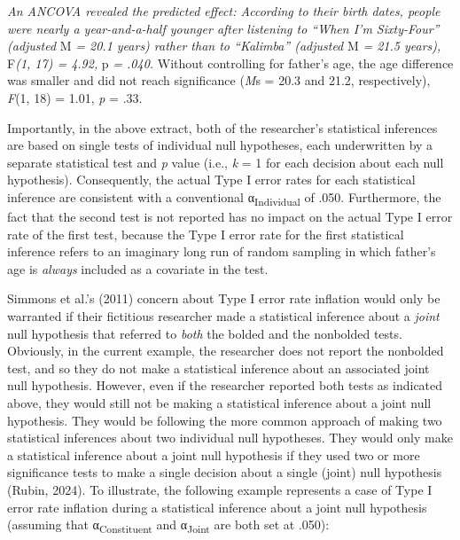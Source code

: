 \documentclass[authordate, meta]{jote-new-article}
\begin{document}
	
	\begin{minipage}{.46\textwidth}%
		\emph{An ANCOVA revealed the predicted effect: According to their birth dates, people were nearly a year-and-a-half younger after listening to “When I'm Sixty-Four” (adjusted }M\emph{ = 20.1 years) rather than to “Kalimba” (adjusted }M \emph{= 21.5 years), }F\emph{(1, 17) = 4.92, }p\emph{ = .040.} Without controlling for father's age, the age difference was smaller and did not reach significance (\emph{M}s = 20.3 and 21.2, respectively), \emph{F}(1, 18) = 1.01, \emph{p} = .33.
	\end{minipage}%

		



	Importantly, in the above extract, both of the researcher's statistical inferences are based on single tests of individual null hypotheses, each underwritten by a separate statistical test and\emph{ p} value (i.e., \emph{k }= 1 for each decision about each null hypothesis). Consequently, the actual Type I error rates for each statistical inference are consistent with a conventional α\textsubscript{Individual} of .050. Furthermore, the fact that the second test is not reported has no impact on the actual Type I error rate of the first test, because the Type I error rate for the first statistical inference refers to an imaginary long run of random sampling in which father's age is \emph{always} included as a covariate in the test.



	Simmons et al.'s (2011) concern about Type I error rate inflation would only be warranted if their fictitious researcher made a statistical inference about a \emph{joint} null hypothesis that referred to \emph{both} the bolded and the nonbolded tests. Obviously, in the current example, the researcher does not report the nonbolded test, and so they do not make a statistical inference about an associated joint null hypothesis. However, even if the researcher reported both tests as indicated above, they would still not be making a statistical inference about a joint null hypothesis. They would be following the more common approach of making two statistical inferences about two individual null hypotheses. They would only make a statistical inference about a joint null hypothesis if they used two or more significance tests to make a single decision about a single (joint) null hypothesis (Rubin, 2024). To illustrate, the following example represents a case of Type I error rate inflation during a statistical inference about a joint null hypothesis (assuming that α\textsubscript{Constituent} and α\textsubscript{Joint} are both set at .050):
\end{document}

